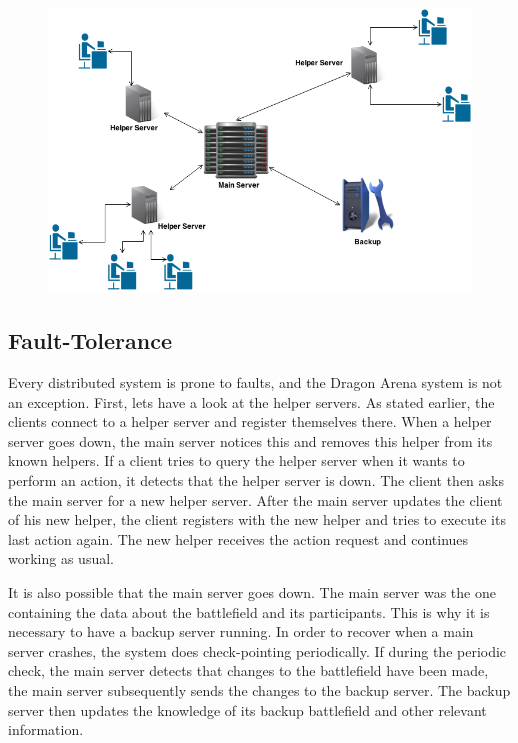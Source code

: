 \begin{figure}[ht]
\includegraphics[scale=0.5]{DCS.png}
\end{figure}

\subsection{Fault-Tolerance}
Every distributed system is prone to faults, and the Dragon Arena system is not an exception. 
First, lets have a look at the helper servers. As stated earlier, the clients connect to a helper server and register themselves there.
When a helper server goes down, the main server notices this and removes this helper from its known helpers.
If a client tries to query the helper server when it wants to perform an action, it detects that the helper server is down.
The client then asks the main server for a new helper server.
After the main server updates the client of his new helper, the client registers with the new helper and tries to execute its last action again.
The new helper receives the action request and continues working as usual.

It is also possible that the main server goes down. 
The main server was the one containing the data about the battlefield and its participants.
This is why it is necessary to have a backup server running.  
In order to recover when a main server crashes, the system does check-pointing periodically.
If during the periodic check, the main server detects that changes to the battlefield have been made, the main server subsequently sends the changes to the backup server.
The backup server then updates the knowledge of its backup battlefield and other relevant information.

